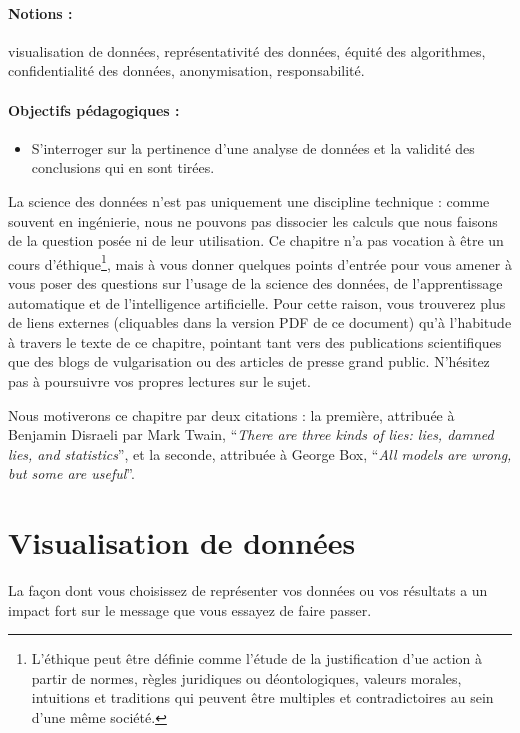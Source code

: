 \label{chap:pratiques}

\paragraph{Notions :} visualisation de données, représentativité des données,
équité des algorithmes, confidentialité des données, anonymisation,
responsabilité.

\paragraph{Objectifs pédagogiques :} 
\begin{itemize}      
  \setlength{\itemsep}{3pt}
\item S'interroger sur la pertinence d'une analyse de données et la validité
  des conclusions qui en sont tirées.
\end{itemize}

La science des données n'est pas uniquement une discipline technique : comme
souvent en ingénierie, nous ne pouvons pas dissocier les calculs que nous
faisons de la question posée ni de leur utilisation. Ce chapitre n'a pas
vocation à être un cours d'éthique\footnote{L'éthique peut être définie comme
  l'étude de la justification d'ue action à partir de normes, règles juridiques
  ou déontologiques, valeurs morales, intuitions et traditions qui peuvent être
  multiples et contradictoires au sein d'une même société.}, mais à vous donner
quelques points d'entrée pour vous amener à vous poser des questions sur
l'usage de la science des données, de l'apprentissage automatique et de
l'intelligence artificielle. Pour cette raison, vous trouverez plus de liens
externes (cliquables dans la version PDF de ce document) qu'à l'habitude à
travers le texte de ce chapitre, pointant tant vers des publications
scientifiques que des blogs de vulgarisation ou des articles de presse grand
public. N'hésitez pas à poursuivre vos propres lectures sur le sujet.

Nous motiverons ce chapitre par deux citations : la première, attribuée à
Benjamin Disraeli par Mark Twain, ``\textit{There are three kinds of lies:
  lies, damned lies, and statistics}'', et la seconde, attribuée à George
Box, ``\textit{All models are wrong, but some are useful}''.

\section{Visualisation de données}
La façon dont vous choisissez de représenter vos données ou vos résultats a un
impact fort sur le message que vous essayez de faire passer. 


